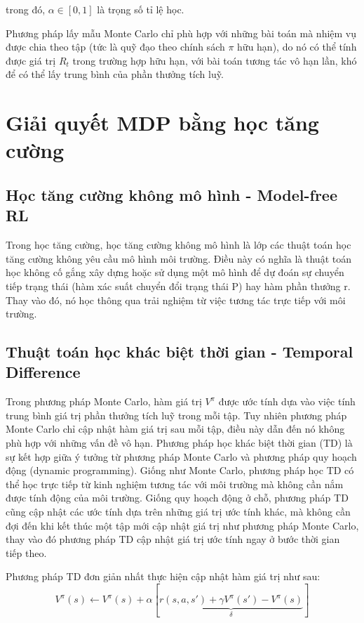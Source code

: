 \documentclass{uetgraduation}
\begin{document}
trong đó, $\alpha \in [0, 1]$ là trọng số tỉ lệ học.

Phương pháp lấy mẫu Monte Carlo chỉ phù hợp với những bài toán mà nhiệm vụ được chia theo tập (tức là quỹ đạo theo chính sách $\pi$ hữu hạn), do nó có thể tính
được giá trị $R_t$ trong trường hợp hữu hạn, với bài toán tương tác vô hạn lần, khó để có thể lấy trung bình của phần thưởng tích luỹ.

\section{Giải quyết MDP bằng học tăng cường}
\subsection{Học tăng cường không mô hình - Model-free RL}
Trong học tăng cường, học tăng cường không mô hình là lớp các thuật toán học tăng cường không yêu cầu mô hình môi trường. Điều này có nghĩa là thuật toán học
không cố gắng xây dựng hoặc sử dụng một mô hình để dự đoán sự chuyển tiếp trạng thái (hàm xác suất chuyển đổi trạng thái P) hay hàm phần thưởng r. Thay vào đó, nó học thông
qua trải nghiệm từ việc tương tác trực tiếp với môi trường.

\subsection{Thuật toán học khác biệt thời gian - Temporal Difference}
Trong phương pháp Monte Carlo, hàm giá trị $V^\pi$ được ước tính dựa vào việc tính trung bình giá trị phần thưởng tích luỹ trong mỗi tập. Tuy nhiên phương pháp Monte Carlo chỉ cập nhật
hàm giá trị sau mỗi tập, điều này dẫn đến nó không phù hợp với những vấn đề vô hạn. Phương pháp học khác biệt thời gian (TD) là sự kết hợp giữa ý tưởng từ phương pháp Monte Carlo và
phương pháp quy hoạch động (dynamic programming). Giống như Monte Carlo, phương pháp học TD có thể học trực tiếp từ kinh nghiệm tương tác với môi trường mà không cần nắm được tính
động của môi trường. Giống quy hoạch động ở chỗ, phương pháp TD cũng cập nhật các ước tính dựa trên những giá trị ước tính khác, mà không cần đợi đến khi kết thúc một tập mới cập
nhật giá trị như phương pháp Monte Carlo, thay vào đó phương pháp TD cập nhật giá trị ước tính ngay ở bước thời gian tiếp theo.

Phương pháp TD đơn giản nhất thực hiện cập nhật hàm giá trị như sau:
\begin{equation}
    V^\pi (s) \leftarrow V^\pi (s) + \alpha [\underbrace{r(s, a, s') + \gamma V^\pi (s') - V^\pi (s)}_\delta]
\end{equation}
\end{document}
